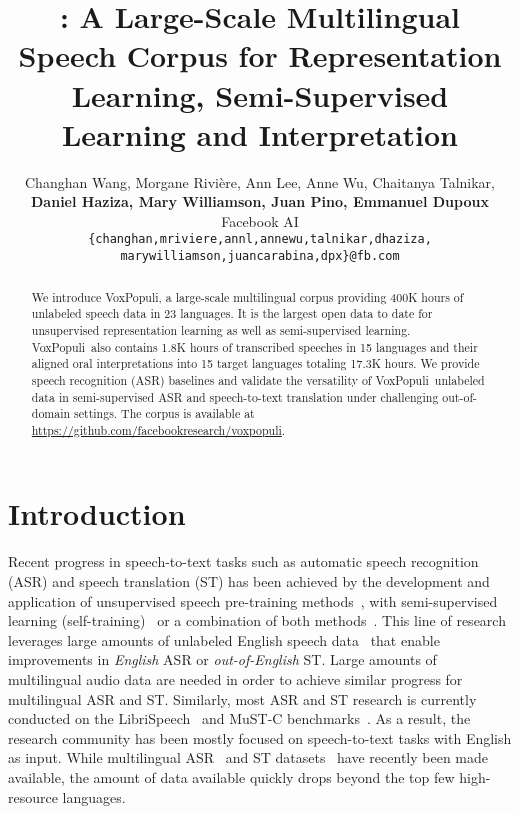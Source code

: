 \documentclass[11pt,a4paper]{article}
\title{\vp: A Large-Scale Multilingual Speech Corpus for Representation Learning, Semi-Supervised Learning and Interpretation}
\author{Changhan Wang, Morgane Rivi\`ere, Ann Lee, Anne Wu, Chaitanya Talnikar, \\
\textbf{Daniel Haziza, Mary Williamson, Juan Pino, Emmanuel Dupoux} \vspace*{0.2cm} \\
  Facebook AI \vspace*{0.2cm} \\
  \texttt{\{changhan,mriviere,annl,annewu,talnikar,dhaziza,} \\
  \texttt{marywilliamson,juancarabina,dpx\}@fb.com}}
\date{}
\newcommand{\vp}{VoxPopuli}
\begin{document}
\maketitle

\renewcommand{\thefootnote}{}
\renewcommand{\thefootnote}{1}

\begin{abstract}
We introduce \vp, a large-scale multilingual corpus providing 400K hours of unlabeled speech data in 23 languages. It is the largest open data to date for unsupervised representation learning as well as semi-supervised learning. \vp~also contains 1.8K hours of transcribed speeches in 15 languages and their aligned oral interpretations into 15 target languages totaling 17.3K hours. We provide speech recognition (ASR) baselines and validate the versatility of \vp~unlabeled data in semi-supervised ASR and speech-to-text translation under challenging out-of-domain settings. The corpus is available
at \url{https://github.com/facebookresearch/voxpopuli}.
\end{abstract}

\section{Introduction}

Recent progress in speech-to-text tasks such as automatic speech recognition (ASR) and speech translation (ST) has been achieved by the development and application of unsupervised speech pre-training methods~\cite{oord2018representation,Schneider2019,baevski2020wav2vec,conneau2020unsupervised,Wu2020SelfSupervisedRI,Nguyen2020InvestigatingSP}, with semi-supervised learning (self-training)~\cite{kahn2020self,Pino2020SelfTrainingFE,zhang2020pushing,xu2020self} or a combination of both methods~\cite{xu2020self}.
This line of research leverages large amounts of unlabeled English speech data~\cite{kahn2020libri} that enable improvements in \emph{English} ASR or \emph{out-of-English} ST.
Large amounts of multilingual audio data are needed in order to achieve similar progress for multilingual ASR and ST.
Similarly, most ASR and ST research is currently conducted on the LibriSpeech~\cite{panayotov2015librispeech} and MuST-C benchmarks~\cite{cattoni2020must,di2019must}. As a result, the research community has been mostly focused on speech-to-text tasks with English as input.
While multilingual ASR~\cite{Pratap2020,ardila-etal-2020-common} and ST datasets~\cite{wang2020covost,iranzo2020europarl} have recently been made available, the amount of data available quickly drops beyond the top few high-resource languages.
\end{document}
